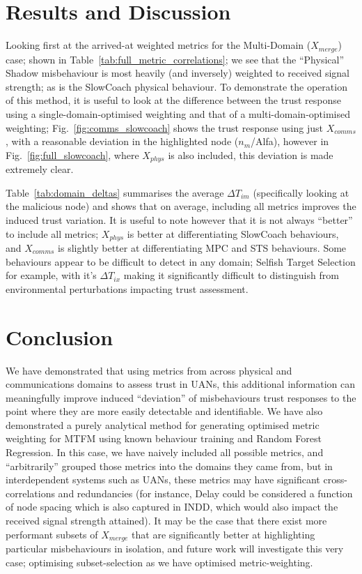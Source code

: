 \documentclass[conference]{IEEEtran}
\begin{document}
\section{Results and Discussion}\label{sec:results}
Looking first at the arrived-at weighted metrics for the Multi-Domain ($X_{merge}$) case; shown in Table~\ref{tab:full_metric_correlations}; we see that the ``Physical'' Shadow misbehaviour is most heavily (and inversely) weighted to received signal strength; as is the SlowCoach physical behaviour. 
To demonstrate the operation of this method, it is useful to look at the difference between the trust response using a single-domain-optimised weighting and that of a multi-domain-optimised weighting; Fig.~\ref{fig:comms_slowcoach} shows the trust response using just $X_{comms}$, with a reasonable deviation in the highlighted node ($n_m$/Alfa), however in Fig.~\ref{fig:full_slowcoach}, where $X_{phys}$ is also included, this deviation is made extremely clear.

Table~\ref{tab:domain_deltas} summarises the average $\Delta T_{im}$ (specifically looking at the malicious node) and shows that on average, including all metrics improves the induced trust variation. 
It is useful to note however that it is not always ``better'' to include all metrics; $X_{phys}$ is better at differentiating SlowCoach behaviours, and $X_{comms}$ is slightly better at differentiating MPC and STS behaviours.
Some behaviours appear to be difficult to detect in any domain; Selfish Target Selection for example, with it's $\Delta T_{ix}$ making it significantly difficult to distinguish from environmental perturbations impacting trust assessment.



\section{Conclusion}
We have demonstrated that using metrics from across physical and communications domains to assess trust in UANs, this additional information can meaningfully improve induced ``deviation'' of misbehaviours trust responses to the point where they are more easily detectable and identifiable.
We have also demonstrated a purely analytical method for generating optimised metric weighting for MTFM using known behaviour training and Random Forest Regression.
In this case, we have naively included all possible metrics, and ``arbitrarily'' grouped those metrics into the domains they came from, but in interdependent systems such as UANs, these metrics may have significant cross-correlations and redundancies (for instance, Delay could be considered a function of node spacing which is also captured in INDD, which would also impact the received signal strength attained).
It may be the case that there exist more performant subsets of $X_{merge}$ that are significantly better at highlighting particular misbehaviours in isolation, and future work will investigate this very case; optimising subset-selection as we have optimised metric-weighting.
\end{document}
